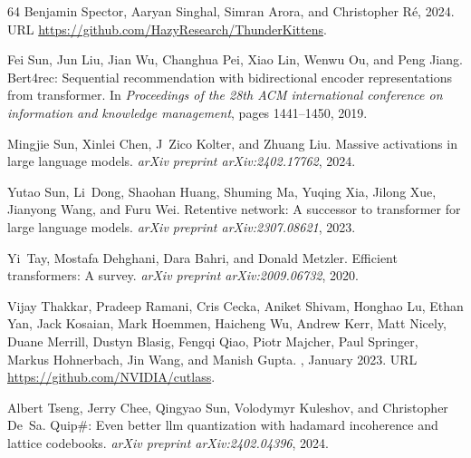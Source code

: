 \documentclass{article}
\begin{document}
\begin{thebibliography}{64}
Benjamin Spector, Aaryan Singhal, Simran Arora, and Christopher R{\'e}, 2024.
\newblock URL \url{https://github.com/HazyResearch/ThunderKittens}.

Fei Sun, Jun Liu, Jian Wu, Changhua Pei, Xiao Lin, Wenwu Ou, and Peng Jiang.
\newblock Bert4rec: Sequential recommendation with bidirectional encoder
  representations from transformer.
\newblock In \emph{Proceedings of the 28th ACM international conference on
  information and knowledge management}, pages 1441--1450, 2019.

Mingjie Sun, Xinlei Chen, J~Zico Kolter, and Zhuang Liu.
\newblock Massive activations in large language models.
\newblock \emph{arXiv preprint arXiv:2402.17762}, 2024.

Yutao Sun, Li~Dong, Shaohan Huang, Shuming Ma, Yuqing Xia, Jilong Xue, Jianyong
  Wang, and Furu Wei.
\newblock Retentive network: A successor to transformer for large language
  models.
\newblock \emph{arXiv preprint arXiv:2307.08621}, 2023.

Yi~Tay, Mostafa Dehghani, Dara Bahri, and Donald Metzler.
\newblock Efficient transformers: A survey.
\newblock \emph{arXiv preprint arXiv:2009.06732}, 2020.

Vijay Thakkar, Pradeep Ramani, Cris Cecka, Aniket Shivam, Honghao Lu, Ethan
  Yan, Jack Kosaian, Mark Hoemmen, Haicheng Wu, Andrew Kerr, Matt Nicely, Duane
  Merrill, Dustyn Blasig, Fengqi Qiao, Piotr Majcher, Paul Springer, Markus
  Hohnerbach, Jin Wang, and Manish Gupta.
, January 2023.
\newblock URL \url{https://github.com/NVIDIA/cutlass}.

Albert Tseng, Jerry Chee, Qingyao Sun, Volodymyr Kuleshov, and Christopher
  De~Sa.
\newblock Quip\#: Even better llm quantization with hadamard incoherence and
  lattice codebooks.
\newblock \emph{arXiv preprint arXiv:2402.04396}, 2024.


\end{thebibliography}
\end{document}
